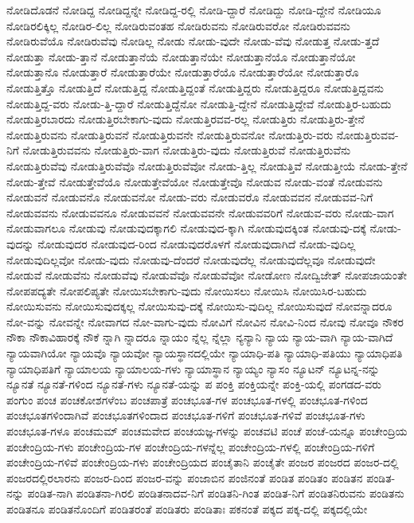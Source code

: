 {ನೋಡಿದೊಡನೆ
ನೋಡಿದ್ದ
ನೋಡಿದ್ದನ್ನೇ
ನೋಡಿದ್ದ-ರಲ್ಲಿ
ನೋಡಿ-ದ್ದಾರೆ
ನೋಡಿದ್ದು
ನೋಡಿ-ದ್ದೇನೆ
ನೋಡಿಯೂ
ನೋಡಿರಲಿಕ್ಕಿಲ್ಲ
ನೋಡಿರ-ಲಿಲ್ಲ
ನೋಡಿರುವಂತಹ
ನೋಡಿರುವನು
ನೋಡಿರುವರೋ
ನೋಡಿರುವವನು
ನೋಡಿರುವೆಯೊ
ನೋಡಿರುವೆವು
ನೋಡಿಲ್ಲ
ನೋಡು
ನೋಡು-ವುದೇ
ನೋಡು-ವೆವು
ನೋಡುತ್ತ
ನೋಡು-ತ್ತದೆ
ನೋಡುತ್ತಾ
ನೋಡು-ತ್ತಾನೆ
ನೋಡುತ್ತಾನೆಯೆ
ನೋಡುತ್ತಾನೆಯೇ
ನೋಡುತ್ತಾನೆಯೊ
ನೋಡುತ್ತಾನೆಯೋ
ನೋಡುತ್ತಾನೊ
ನೋಡುತ್ತಾರೆ
ನೋಡುತ್ತಾರೆಯೇ
ನೋಡುತ್ತಾರೆಯೊ
ನೋಡುತ್ತಾರೆಯೋ
ನೋಡುತ್ತಾರೊ
ನೋಡುತ್ತಿತ್ತೊ
ನೋಡುತ್ತಿದೆ
ನೋಡುತ್ತಿದ್ದ
ನೋಡುತ್ತಿದ್ದಂತೆ
ನೋಡುತ್ತಿದ್ದರು
ನೋಡುತ್ತಿದ್ದರೂ
ನೋಡುತ್ತಿದ್ದವನು
ನೋಡುತ್ತಿದ್ದ-ವರು
ನೋಡು-ತ್ತಿ-ದ್ದಾರೆ
ನೋಡುತ್ತಿದ್ದೆನೋ
ನೋಡುತ್ತಿ-ದ್ದೇನೆ
ನೋಡುತ್ತಿದ್ದೇವೆ
ನೋಡುತ್ತಿರ-ಬಹುದು
ನೋಡುತ್ತಿರಬಾರದು
ನೋಡುತ್ತಿರಬೇಕಾಗು-ವುದು
ನೋಡುತ್ತಿರವವ-ರಲ್ಲ
ನೋಡುತ್ತಿರು
ನೋಡುತ್ತಿರು-ತ್ತೇನೆ
ನೋಡುತ್ತಿರುವನು
ನೋಡುತ್ತಿರುವನೆ
ನೋಡುತ್ತಿರುವನೇ
ನೋಡುತ್ತಿರುವನೋ
ನೋಡುತ್ತಿರು-ವರು
ನೋಡುತ್ತಿರುವವ-ನಿಗೆ
ನೋಡುತ್ತಿರುವವನು
ನೋಡುತ್ತಿರು-ವಾಗ
ನೋಡುತ್ತಿರು-ವುದು
ನೋಡುತ್ತಿರುವೆ
ನೋಡುತ್ತಿರುವೆನು
ನೋಡುತ್ತಿರುವೆವು
ನೋಡುತ್ತಿರುವೆವೊ
ನೋಡುತ್ತಿರುವೆವೋ
ನೋಡು-ತ್ತಿಲ್ಲ
ನೋಡುತ್ತಿವೆ
ನೋಡುತ್ತೀಯೆ
ನೋಡು-ತ್ತೇನೆ
ನೋಡು-ತ್ತೇವೆ
ನೋಡುತ್ತೇವೆಯೊ
ನೋಡುತ್ತೇವೆಯೋ
ನೋಡುತ್ತೇವೊ
ನೋಡುವ
ನೋಡು-ವಂತೆ
ನೋಡುವನು
ನೋಡುವನೆ
ನೋಡುವನೊ
ನೋಡುವನೋ
ನೋಡು-ವರು
ನೋಡುವರೊ
ನೋಡುವವನ
ನೋಡುವವ-ನಿಗೆ
ನೋಡುವವನು
ನೋಡುವವನೂ
ನೋಡುವವನೆ
ನೋಡುವವನೇ
ನೋಡುವವರಿಗೆ
ನೋಡುವ-ವರು
ನೋಡು-ವಾಗ
ನೋಡುವಾಗಲೂ
ನೋಡುವು
ನೋಡುವುದಕ್ಕಾಗಲಿ
ನೋಡುವುದ-ಕ್ಕಾಗಿ
ನೋಡುವುದಕ್ಕಿಂತ
ನೋಡುವು-ದಕ್ಕೆ
ನೋಡು-ವುದನ್ನು
ನೋಡುವುದರ
ನೋಡುವುದ-ರಿಂದ
ನೋಡುವುದರೊಳಗೆ
ನೋಡುವುದಾಗಿದೆ
ನೋಡು-ವುದಿಲ್ಲ
ನೋಡುವುದಿಲ್ಲವೋ
ನೋಡು-ವುದು
ನೋಡುವು-ದೆಂದರೆ
ನೋಡುವುದೆಲ್ಲ
ನೋಡುವುದೆಲ್ಲವೂ
ನೋಡುವುದೇ
ನೋಡುವೆ
ನೋಡುವೆನು
ನೋಡುವೆವು
ನೋಡುವೆವೊ
ನೋಡುವೆವೋ
ನೋಡೋಣ
ನೋದ್ವಿಜೇತ್
ನೋಪಜಾಯಂತೇ
ನೋಪಪದ್ಯತೇ
ನೋಪಲಿಪ್ಯತೇ
ನೋಯಿಸಬೇಕಾಗು-ವುದು
ನೋಯಿಸಲು
ನೋಯಿಸಿ
ನೋಯಿಸಿರ-ಬಹುದು
ನೋಯಿಸುವನು
ನೋಯಿಸುವುದಕ್ಕಲ್ಲ
ನೋಯಿಸುವು-ದಕ್ಕೆ
ನೋಯಿಸು-ವುದಿಲ್ಲ
ನೋಯಿಸುವುದೆ
ನೋವನ್ನಾದರೂ
ನೋ-ವನ್ನು
ನೋವನ್ನೇ
ನೋವಾಗದ
ನೋ-ವಾಗು-ವುದು
ನೋವಿಗೆ
ನೋವಿನ
ನೋವಿ-ನಿಂದ
ನೋವು
ನೋವೂ
ನೌಕರ
ನೌಕಾ
ನೌಕಾವಿಹಾರಕ್ಕೆ
ನೌಕೆ
ನ್ನಾಗಿ
ನ್ನಾದರೂ
ನ್ನಾಯಂ
ನ್ನೆಲ್ಲ
ನ್ನೆಲ್ಲಾ
ನ್ಯನ್ಯಾನಿ
ನ್ಯಾಯ
ನ್ಯಾಯ-ವಾಗಿ
ನ್ಯಾಯ-ವಾಗಿದೆ
ನ್ಯಾಯವಾಗಿಯೋ
ನ್ಯಾಯವೊ
ನ್ಯಾಯವೋ
ನ್ಯಾಯಸ್ಥಾನದಲ್ಲಿಯೇ
ನ್ಯಾಯಾಧಿ-ಪತಿ
ನ್ಯಾಯಾಧಿ-ಪತಿಯು
ನ್ಯಾಯಾಧಿಪತಿ
ನ್ಯಾಯಾಧಿಪತಿಗೆ
ನ್ಯಾಯಾಲಯ
ನ್ಯಾಯಾಲಯ-ಗಳು
ನ್ಯಾಯಾಸ್ಥಾನ
ನ್ಯಾಯ್ಯಂ
ನ್ಯಾಸಂ
ನ್ಯೂಟನ್
ನ್ಯೂಟನ್ನ-ನನ್ನು
ನ್ಯೂನತೆ
ನ್ಯೂನತೆ-ಗಳಿಂದ
ನ್ಯೂನತೆ-ಗಳು
ನ್ಯೂನತೆ-ಯನ್ನು
ಪ
ಪಂಕ್ತಿ
ಪಂಕ್ತಿಯನ್ನೇ
ಪಂಕ್ತಿ-ಯಲ್ಲಿ
ಪಂಗಡದ-ವರು
ಪಂಗುಂ
ಪಂಚ
ಪಂಚಕೋಶಗಳೆಂಬ
ಪಂಚಪಾತ್ರೆ
ಪಂಚಭೂತ-ಗಳ
ಪಂಚಭೂತ-ಗಳಲ್ಲಿ
ಪಂಚಭೂತ-ಗಳಿಂದ
ಪಂಚಭೂತಗಳಿಂದಾಗಿವೆ
ಪಂಚಭೂತಗಳಿಂದಾದ
ಪಂಚಭೂತ-ಗಳಿಗೆ
ಪಂಚಭೂತ-ಗಳಿವೆ
ಪಂಚಭೂತ-ಗಳು
ಪಂಚಭೂತ-ಗಳೂ
ಪಂಚಮಮ್
ಪಂಚಮವೇದ
ಪಂಚಯಜ್ಞ-ಗಳನ್ನು
ಪಂಚವಟಿ
ಪಂಚೆ
ಪಂಚೆ-ಯನ್ನೂ
ಪಂಚೇಂದ್ರಿಯ
ಪಂಚೇಂದ್ರಿಯ-ಗಳು
ಪಂಚೇಂದ್ರಿಯ-ಗಳ
ಪಂಚೇಂದ್ರಿಯ-ಗಳನ್ನೆಲ್ಲ
ಪಂಚೇಂದ್ರಿಯ-ಗಳಲ್ಲಿ
ಪಂಚೇಂದ್ರಿಯ-ಗಳಿಗೆ
ಪಂಚೇಂದ್ರಿಯ-ಗಳಿವೆ
ಪಂಚೇಂದ್ರಿಯ-ಗಳು
ಪಂಚೇಂದ್ರಿಯದ
ಪಂಚೈತಾನಿ
ಪಂಚೈತೇ
ಪಂಜರ
ಪಂಜರದ
ಪಂಜರ-ದಲ್ಲಿ
ಪಂಜರದಲ್ಲಿರಲಾರನು
ಪಂಜರ-ದಿಂದ
ಪಂಜರ-ವನ್ನು
ಪಂಜಾಬಿನ
ಪಂಜಿನಂತೆ
ಪಂಡಿತ
ಪಂಡಿತಂ
ಪಂಡಿತನ
ಪಂಡಿತ-ನನ್ನು
ಪಂಡಿತ-ನಾಗಿ
ಪಂಡಿತನಾ-ಗಿರಲಿ
ಪಂಡಿತನಾದವ-ನಿಗೆ
ಪಂಡಿತನಿ-ಗಿಂತ
ಪಂಡಿತ-ನಿಗೆ
ಪಂಡಿತನಿರುವನು
ಪಂಡಿತನು
ಪಂಡಿತನೂ
ಪಂಡಿತನೊಂದಿಗೆ
ಪಂಡಿತರಂತೆ
ಪಂಡಿತರು
ಪಂಡಿತಾಃ
ಪಕನಂತೆ
ಪಕ್ಕದ
ಪಕ್ಕ-ದಲ್ಲಿ
ಪಕ್ಕದಲ್ಲಿಯೇ
}

